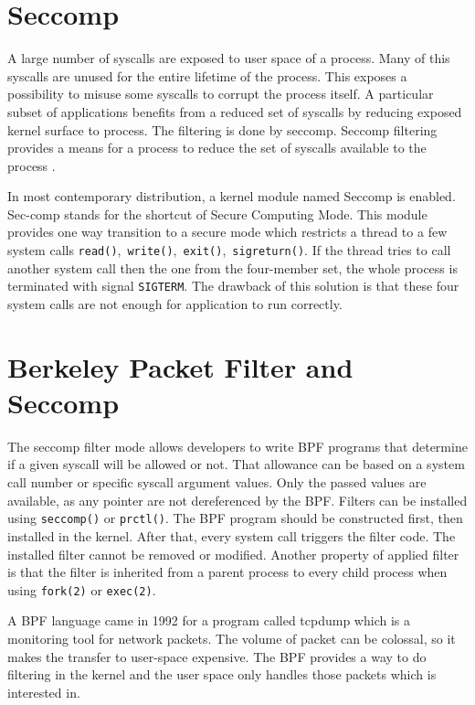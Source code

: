 \section{Seccomp}
A large number of syscalls are exposed to user space of a process.
Many of this syscalls are unused for the entire lifetime of the process.
This exposes a possibility to misuse some syscalls to corrupt the process itself.
A particular subset of applications benefits from a reduced set of syscalls by reducing exposed kernel surface to process.
The filtering is done by seccomp.
Seccomp filtering provides a means for a process to reduce the set of syscalls available to the process \cite{seccomp_kernel_doc}.

In most contemporary distribution, a kernel module named Seccomp \cite{seccomp_sandbox} is enabled.
Sec-comp stands for the shortcut of Secure Computing Mode.
This module provides one way transition to a secure mode which restricts a thread to a few system calls \texttt{read()},\ \texttt{write()},\ \texttt{exit()},\ \texttt{sigreturn()}.
If the thread tries to call another system call then the one from the four-member set, the whole process is terminated with signal \texttt{SIGTERM}.
The drawback of this solution is that these four system calls are not enough for application to run correctly.


\section{Berkeley Packet Filter and Seccomp}
The seccomp filter mode allows developers to write BPF programs that determine if a given syscall will be allowed or not.
That allowance can be based on a system call number or specific syscall argument values.
Only the passed values are available, as any pointer are not dereferenced by the BPF.
Filters can be installed using \texttt{seccomp()} or \texttt{prctl()}.
The BPF program should be constructed first, then installed in the kernel.
After that, every system call triggers the filter code.
The installed filter cannot be removed or modified.
Another property of applied filter is that the filter is inherited from a parent process to every child process when using \texttt{fork(2)} or \texttt{exec(2)}.

A BPF language came in 1992 for a program called tcpdump which is a monitoring tool for network packets.
The volume of packet can be colossal, so it makes the transfer to user-space expensive.
The BPF provides a way to do filtering in the kernel and the user space only handles those packets which is interested in.

